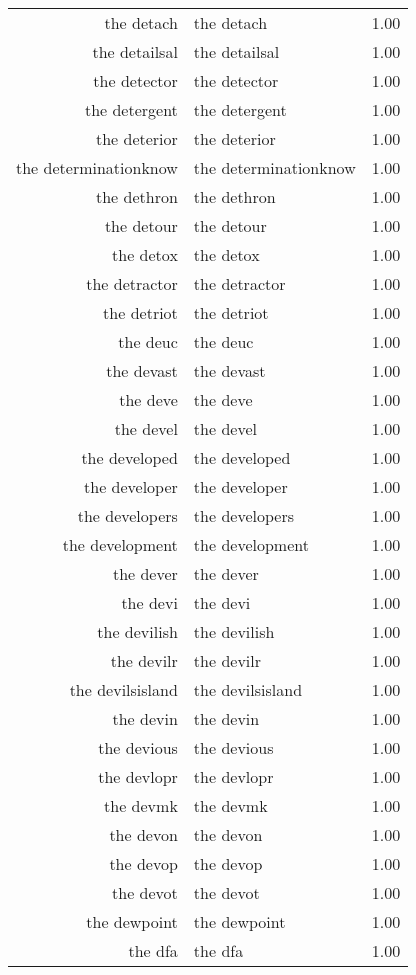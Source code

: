 \begin{table}[ht]
\begin{tabular}{rlr}
  the detach & the detach & 1.00 \\ 
  the detailsal & the detailsal & 1.00 \\ 
  the detector & the detector & 1.00 \\ 
  the detergent & the detergent & 1.00 \\ 
  the deterior & the deterior & 1.00 \\ 
  the determinationknow & the determinationknow & 1.00 \\ 
  the dethron & the dethron & 1.00 \\ 
  the detour & the detour & 1.00 \\ 
  the detox & the detox & 1.00 \\ 
  the detractor & the detractor & 1.00 \\ 
  the detriot & the detriot & 1.00 \\ 
  the deuc & the deuc & 1.00 \\ 
  the devast & the devast & 1.00 \\ 
  the deve & the deve & 1.00 \\ 
  the devel & the devel & 1.00 \\ 
  the developed & the developed & 1.00 \\ 
  the developer & the developer & 1.00 \\ 
  the developers & the developers & 1.00 \\ 
  the development & the development & 1.00 \\ 
  the dever & the dever & 1.00 \\ 
  the devi & the devi & 1.00 \\ 
  the devilish & the devilish & 1.00 \\ 
  the devilr & the devilr & 1.00 \\ 
  the devilsisland & the devilsisland & 1.00 \\ 
  the devin & the devin & 1.00 \\ 
  the devious & the devious & 1.00 \\ 
  the devlopr & the devlopr & 1.00 \\ 
  the devmk & the devmk & 1.00 \\ 
  the devon & the devon & 1.00 \\ 
  the devop & the devop & 1.00 \\ 
  the devot & the devot & 1.00 \\ 
  the dewpoint & the dewpoint & 1.00 \\ 
  the dfa & the dfa & 1.00 \\ 

\end{tabular}
\end{table}
